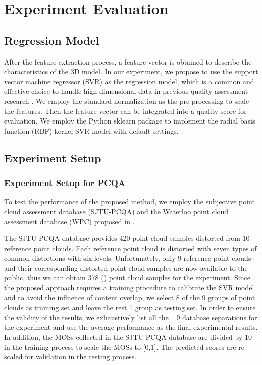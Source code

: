 \documentclass[lettersize,journal]{IEEEtran}
\begin{document}
  



\section{Experiment Evaluation}
\label{sec:experiment}

\subsection{Regression Model}
After the feature extraction process, a feature vector is obtained to describe the characteristics of the 3D model. In our experiment, we propose to use the support vector machine regressor (SVR) as the regression model, which is a common and effective choice to handle high dimensional data in previous quality assessment research \cite{nr-svr} \cite{brisque}. We employ the standard normalization as the pre-processing to scale the features. Then the feature vector can be integrated into a quality score for evaluation. We employ the Python sklearn package \cite{sklearn} to implement the radial basis function (RBF) kernel SVR model with default settings.








\subsection{Experiment Setup}
\subsubsection{Experiment Setup for PCQA}
 To test the performance of the proposed method, we employ the subjective point cloud assessment database (SJTU-PCQA) \cite{sjtu-pcqa} and the Waterloo point cloud assessment database (WPC) proposed in \cite{su2021perceptual}. 
 
 The SJTU-PCQA database provides 420 point cloud samples distorted from 10 reference point clouds. Each reference point cloud is distorted with seven types of common distortions with six levels. Unfortunately, only 9 reference point clouds and their corresponding distorted point cloud samples are now available to the public, thus we can obtain 378 () point cloud samples for the experiment.
Since the proposed approach requires a training procedure to calibrate the SVR model and to avoid the influence of content overlap, we select 8 of the 9 groups of point clouds as training set and leave the rest 1 group as testing set. In order to ensure the validity of the results, we exhaustively list all the =9 database separations for the experiment and use the average performance as the final experimental results. In addition, the MOSs collected in the SJTU-PCQA database are divided by 10 in the training process to scale the MOSs to [0,1]. The predicted scores are re-scaled for validation in the testing process. 
\end{document}
